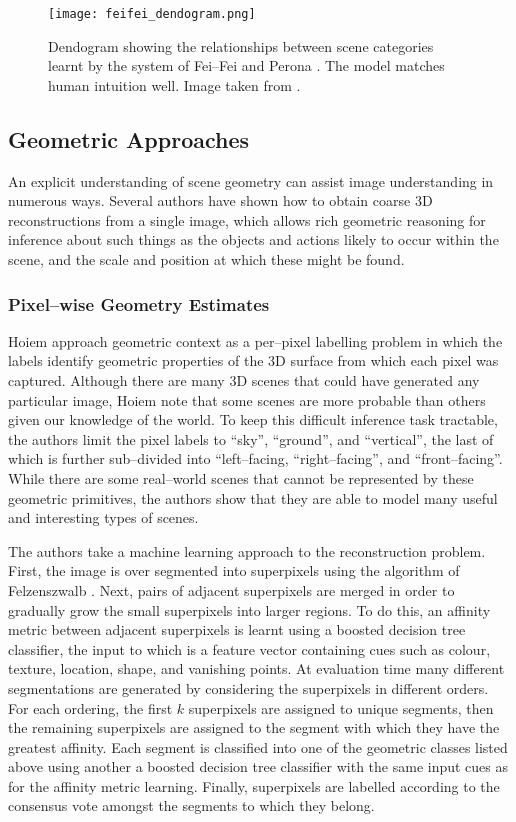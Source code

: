 \begin{figure}[htp]
\centering
\texttt{[image: feifei\_dendogram.png]}
\caption{Dendogram showing the relationships between scene categories
  learnt by the system of Fei--Fei and Perona \cite{Fei-fei05}. The
  model matches human intuition well. Image taken from
  \cite{Fei-fei05}.}
\label{fig:dendogram}
\end{figure}

\subsection{Geometric Approaches}

An explicit understanding of scene geometry can assist image
understanding in numerous ways. Several authors have shown how to
obtain coarse 3D reconstructions from a single image, which allows
rich geometric reasoning for inference about such things as the
objects and actions likely to occur within the scene, and the scale
and position at which these might be found.

\subsubsection{Pixel--wise Geometry Estimates}

Hoiem \etal \cite{Hoiem06} approach geometric context as a per--pixel
labelling problem in which the labels identify geometric properties of
the 3D surface from which each pixel was captured. Although there are
many 3D scenes that could have generated any particular image, Hoiem
\etal note that some scenes are more probable than others given our
knowledge of the world. To keep this difficult inference task
tractable, the authors limit the pixel labels to ``sky'', ``ground'',
and ``vertical'', the last of which is further sub--divided into
``left--facing, ``right--facing'', and ``front--facing''. While there
are some real--world scenes that cannot be represented by these
geometric primitives, the authors show that they are able to model
many useful and interesting types of scenes.

The authors take a machine learning approach to the reconstruction
problem. First, the image is over segmented into superpixels using the
algorithm of Felzenszwalb \etal \cite{Felzenszwalb04}. Next, pairs of
adjacent superpixels are merged in order to gradually grow the small
superpixels into larger regions. To do this, an affinity metric
between adjacent superpixels is learnt using a boosted decision tree
classifier, the input to which is a feature vector containing cues
such as colour, texture, location, shape, and vanishing points. At
evaluation time many different segmentations are generated by
considering the superpixels in different orders. For each ordering,
the first $k$ superpixels are assigned to unique segments, then the
remaining superpixels are assigned to the segment with which they have
the greatest affinity. Each segment is classified into one of the
geometric classes listed above using another a boosted decision tree
classifier with the same input cues as for the affinity metric
learning. Finally, superpixels are labelled according to the consensus
vote amongst the segments to which they belong.

